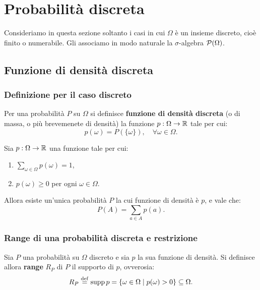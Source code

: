 \chapter{Probabilità discreta}
\setlength{\parindent}{2pt}

\begin{multicols*}{2}

Consideriamo in questa sezione soltanto i casi in cui $\Omega$ è
un insieme discreto, cioè finito o numerabile. Gli associamo
in modo naturale la $\sigma$-algebra $\mathcal{P}(\Omega)$.

\section{Funzione di densità discreta}

\subsection{Definizione per il caso discreto}

\begin{definition}
    Per una probabilità $P$ su $\Omega$ si definisce
    \textbf{funzione di densità discreta} (o di massa, o
    più brevemenete di densità)
    la funzione $p : \Omega \to \mathbb{R}$ tale per cui:
    \[ p(\omega) = P(\{\omega\}), \quad \forall \omega \in \Omega. \]
\end{definition}

\begin{proposition}
    Sia $p : \Omega \to \mathbb{R}$ una funzione tale per cui:
    \begin{enumerate}[(i.)]
        \item $\sum_{\omega \in \Omega} p(\omega) = 1$,
        \item $p(\omega) \geq 0$ per ogni $\omega \in \Omega$.
    \end{enumerate}
    Allora esiste un'unica probabilità $P$ la cui funzione di densità
    è $p$, e vale che:
    \[
        P(A) = \sum_{a \in A} p(a).
    \]
\end{proposition}

\subsection{Range di una probabilità discreta e restrizione}

\begin{definition}[Range di $P$]
    Sia $P$ una probabilità su $\Omega$ discreto e
    sia $p$ la sua funzione di densità. Si
    definisce allora \textbf{range} $R_P$ di $P$ il
    supporto di $p$, ovverosia:
    \[ R_P \overset{\mathrm{def}}{=} \operatorname{supp} p = \{ \omega \in \Omega \mid p(\omega) > 0\} \subseteq \Omega. \]
\end{definition}


\end{multicols*}

